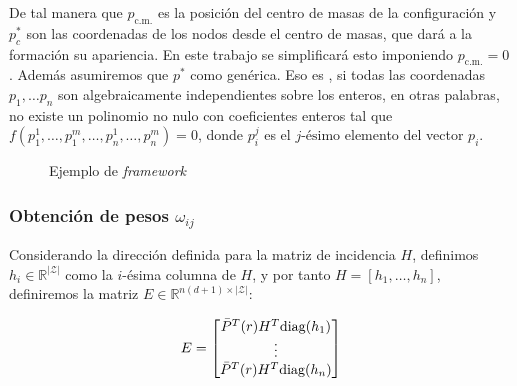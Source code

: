 \documentclass[11pt, a4paper]{article} %
\begin{document}
De tal manera que $p_\text{c.m.}$ es la posición del centro de masas de la configuración y $p^*_c$ son las coordenadas de los nodos desde el centro de masas, que dará a la formación su apariencia. En este trabajo se simplificará esto imponiendo $p_\text{c.m.} = 0$. Además asumiremos que $p^*$ como genérica. Eso es \cite{7339680}, si todas las coordenadas $p_1,\dots p_n$ son algebraicamente independientes sobre los enteros, en otras palabras, no existe un polinomio no nulo con coeficientes enteros tal que $f(p_1^1,\dots,p_1^m,\dots,p_n^1,\dots,p_n^m)= 0$, donde $p_i^j$ es el $j\text{-ésimo}$ elemento del vector $p_i$.
\begin{figure}[h!]
    \centering
\caption{Ejemplo de \textit{framework}}
\label{fig:framework}
\end{figure}


\subsubsection{Obtención de pesos $\omega_{ij}$}
Considerando la dirección definida para la matriz de incidencia $H$, definimos $h_i\in\mathbb{R}^{|\mathcal{Z}|}$ como la $i$-ésima columna de $H$, y por tanto $H = [h_1,\dots,h_n]$, definiremos la matriz $E\in\mathbb{R}^{n(d+1)\times|\mathcal{Z}|}$:

\begin{equation}
E = 
\begin{bmatrix}
\Bar{P}^T(r) H^T \text{diag}(h_1) \\
\vdots \\
\Bar{P}^T(r) H^T \text{diag}(h_n)
\end{bmatrix}
\end{equation}
\end{document}

